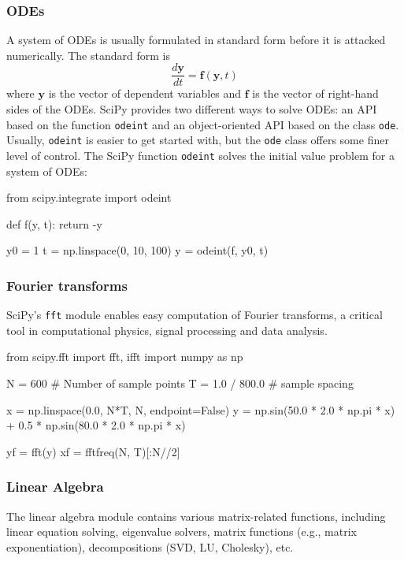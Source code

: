 \subsubsection*{ODEs}

A system of ODEs is usually formulated in standard form before it is attacked numerically. The
standard form is
\[
\frac{d\mathbf{y}}{dt} = \mathbf{f}(\mathbf{y}, t)
\]
where $\mathbf{y}$ is the vector of dependent variables and $\mathbf{f}$ is the vector of right-hand sides of the ODEs. 
SciPy provides two different ways to solve ODEs: an API based on the function \texttt{odeint} and an
object-oriented API based on the class \texttt{ode}. Usually, \texttt{odeint} is easier to get started with, but the
\texttt{ode} class offers some finer level of control.
The SciPy function \texttt{odeint} solves the initial value problem for a system of ODEs:

\begin{codeblock}[language=python]
from scipy.integrate import odeint

def f(y, t):
    return -y

y0 = 1
t = np.linspace(0, 10, 100)
y = odeint(f, y0, t)
\end{codeblock}

\subsubsection*{Fourier transforms}

SciPy's \texttt{fft} module enables easy computation of Fourier transforms, a critical tool in
computational physics, signal processing and data analysis.

\begin{codeblock}[language=python]
from scipy.fft import fft, ifft
import numpy as np

N = 600 # Number of sample points
T = 1.0 / 800.0 # sample spacing

x = np.linspace(0.0, N*T, N, endpoint=False)
y = np.sin(50.0 * 2.0 * np.pi * x) + 0.5 * np.sin(80.0 * 2.0 * np.pi * x)

yf = fft(y)
xf = fftfreq(N, T)[:N//2]
\end{codeblock}

\subsubsection*{Linear Algebra}

The linear algebra module contains various matrix-related functions, including linear equation
solving, eigenvalue solvers, matrix functions (e.g., matrix exponentiation), decompositions (SVD,
LU, Cholesky), etc.

